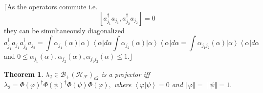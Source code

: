 \documentclass[aps,preprint]{revtex4}%
\newtheorem{theorem}{Theorem}
\begin{document}
$\lceil$As the operators commute i.e.
\begin{equation}
\left[  a_{j_{1}}^{\dagger}a_{j_{1}},a_{j_{2}}^{\dagger}a_{j_{2}}\right]  =0
\end{equation}
they can be simultaneously diagonalized
\begin{equation}
a_{j_{1}}^{\dagger}a_{j_{1}}a_{j_{2}}^{\dagger}a_{j_{2}}=\int\alpha_{j_{1}%
}\left(  \alpha\right)  \left\vert \alpha\right\rangle \left\langle
\alpha\right\vert d\alpha\int\alpha_{j_{2}}\left(  \alpha\right)  \left\vert
\alpha\right\rangle \left\langle \alpha\right\vert d\alpha=\int\alpha
_{j_{1}j_{2}}\left(  \alpha\right)  \left\vert \alpha\right\rangle
\left\langle \alpha\right\vert d\alpha
\end{equation}
and $0\leq\alpha_{j_{1}}\left(  \alpha\right)  ,\alpha_{j_{2}}\left(
\alpha\right)  ,\alpha_{j_{1}j_{2}}\left(  \alpha\right)  \leq1.\rfloor$

\begin{theorem}
$\lambda_{2}\in\mathcal{B}_{+}\left(  \mathcal{H}_{\mathcal{F}}\right)  _{e2}$
is a projector iff $\lambda_{2}=\Phi\left(  \varphi\right)  ^{\dagger}%
\Phi\left(  \psi\right)  ^{\dagger}\Phi\left(  \psi\right)  \Phi\left(
\varphi\right)  ,$ where $\left\langle \varphi\left\vert \psi\right.
\right\rangle =0$ and $\left\Vert \varphi\right\Vert =$ $\left\Vert
\psi\right\Vert =1.$
\end{theorem}
\end{document}
